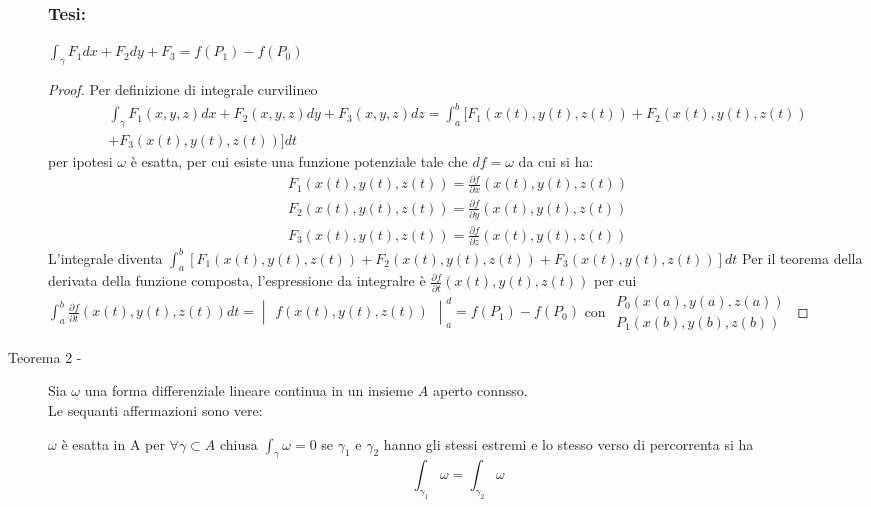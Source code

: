 \documentclass{book}
\begin{document}
\begin{description}
\begin{multicols}{2}
			\subsubsection{Tesi:}
				$\displaystyle\int_\gamma
				F_1dx + F_2 dy+ F_3=f(P_1)-f(P_0)$
		\end{multicols}
		\begin{proof}
			Per definizione di integrale curvilineo
			\begin{eqnarray*}
				\int_\gamma F_1(x,y,z)dx + F_2(x,y,z) dy+ F_3(x,y,z)dz =
				\int_{a}^{b} [F_1(x(t),y(t),z(t)) + F_2(x(t),y(t),z(t))\\ +
				F_3(x(t),y(t),z(t))]dt
			\end{eqnarray*}
			per ipotesi $\omega$ è esatta, per cui esiste una funzione
			potenziale tale che $df=\omega$ da cui si ha:
			\begin{equation*}
				\begin{matrix}
					F_1(x(t),y(t),z(t))=\frac{\partial f}{\partial x}(x(t),y(t),z(t)) \\
					F_2(x(t),y(t),z(t))=\frac{\partial f}{\partial y}(x(t),y(t),z(t)) \\
					F_3(x(t),y(t),z(t))=\frac{\partial f}{\partial z}(x(t),y(t),z(t))
				\end{matrix}
			\end{equation*}
			L'integrale diventa $\int_{a}^{b} [F_1(x(t),y(t),z(t)) + 
			F_2(x(t),y(t),z(t)) + F_3(x(t),y(t),z(t))]dt$
			\clearpage
			Per il teorema della derivata della funzione composta,
			l'espressione da integralre è
			$\frac{\partial f}{\partial t}(x(t),y(t),z(t))$ per cui
			$\int_{a}^{b}\frac{\partial f}{\partial t}(x(t),y(t),z(t))dt=
			\begin{vmatrix}
				f(x(t),y(t),z(t))
			\end{vmatrix}^d_a=f(P_1)-f(P_0)$ con $\begin{matrix}
				P_0(x(a),y(a),z(a))\\
				P_1(x(b),y(b),z(b))
			\end{matrix}$
		\end{proof}
	\item[Teorema 2 -] Sia $\omega$ una forma differenziale lineare continua in
		un insieme $A$ aperto connsso.\\
		Le sequanti affermazioni sono vere:
		\begin{tasks}
			\task $\omega$ è esatta in A
			\task per $\forall \gamma \subset A$ chiusa $\int_\gamma \omega=0$
			\task se $\gamma_1$ e $\gamma_2$ hanno gli stessi estremi e lo
			stesso verso di percorrenta si ha
			\begin{equation*}
				\int_{\gamma_1} \omega=\int_{\gamma_2}\omega
			\end{equation*}
		\end{tasks}
\end{description}
\end{document}
